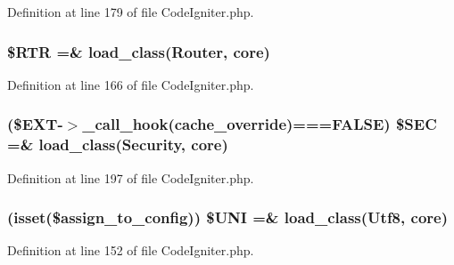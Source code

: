 Definition at line 179 of file Code\+Igniter.\+php.

\subsubsection[{\texorpdfstring{\$\+R\+TR}{$RTR}}]{\setlength{\rightskip}{0pt plus 5cm}\$R\+TR =\& load\+\_\+class(\textquotesingle{}Router\textquotesingle{}, \textquotesingle{}core\textquotesingle{})}\hypertarget{_code_igniter_8php_a4d6c9285c8483e4708a57a4128fc95f3}{}\label{_code_igniter_8php_a4d6c9285c8483e4708a57a4128fc95f3}


Definition at line 166 of file Code\+Igniter.\+php.

\subsubsection[{\texorpdfstring{\$\+S\+EC}{$SEC}}]{ (\${\bf E\+XT}-\/$>$\+\_\+call\+\_\+hook(\textquotesingle{}cache\+\_\+override\textquotesingle{})===F\+A\+L\+SE) \$S\+EC =\& load\+\_\+class(\textquotesingle{}Security\textquotesingle{}, \textquotesingle{}core\textquotesingle{})}\hypertarget{_code_igniter_8php_ad1366cae5e96fdde83a2fd6053334acd}{}\label{_code_igniter_8php_ad1366cae5e96fdde83a2fd6053334acd}


Definition at line 197 of file Code\+Igniter.\+php.

\subsubsection[{\texorpdfstring{\$\+U\+NI}{$UNI}}]{ (isset(\$assign\+\_\+to\+\_\+config)) \$U\+NI =\& load\+\_\+class(\textquotesingle{}Utf8\textquotesingle{}, \textquotesingle{}core\textquotesingle{})}\hypertarget{_code_igniter_8php_a0eedd12db0d3774c174f0dba59577357}{}\label{_code_igniter_8php_a0eedd12db0d3774c174f0dba59577357}


Definition at line 152 of file Code\+Igniter.\+php.


